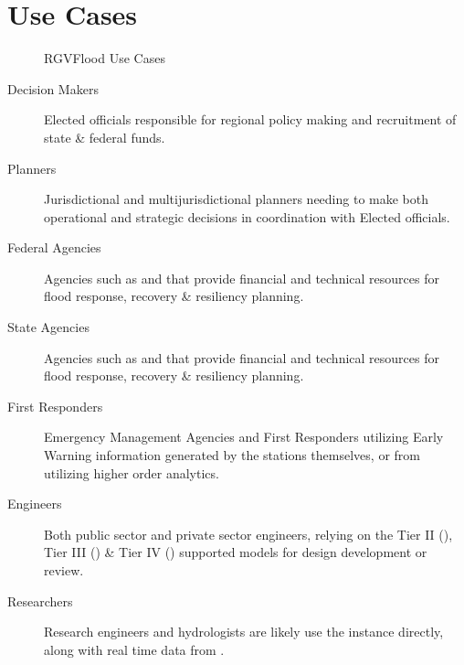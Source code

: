 \documentclass[letterpaper,12pt,english]{sphinxmanual}
\begin{document}
\chapter{Use Cases}
\label{\detokenize{predevelopment/use-cases/use-cases:use-cases}}\label{\detokenize{predevelopment/use-cases/use-cases::doc}}
\begin{figure}[htbp]
\centering
\capstart

\noindent{}
\caption{RGVFlood Use Cases}\label{\detokenize{predevelopment/use-cases/use-cases:id1}}\end{figure}
\begin{description}
\item[{Decision Makers}] \leavevmode
\sphinxAtStartPar
Elected officials responsible for regional policy making and recruitment of state \& federal funds.

\item[{Planners}] \leavevmode
\sphinxAtStartPar
Jurisdictional and multi\sphinxhyphen{}jurisdictional planners needing to make both operational and strategic decisions in coordination with Elected officials.

\item[{Federal Agencies}] \leavevmode
\sphinxAtStartPar
Agencies such as  and  that provide financial and technical resources for flood response, recovery \& resiliency planning.

\item[{State Agencies}] \leavevmode
\sphinxAtStartPar
Agencies such as  and  that provide financial and technical resources for flood response, recovery \& resiliency planning.

\item[{First Responders}] \leavevmode
\sphinxAtStartPar
Emergency Management Agencies and First Responders utilizing Early Warning information generated by the  stations themselves, or from  utilizing higher order analytics.

\item[{Engineers}] \leavevmode
\sphinxAtStartPar
Both public sector and private sector engineers, relying on the  Tier II (), Tier III () \& Tier IV () supported models for design development or review.

\item[{Researchers}] \leavevmode
\sphinxAtStartPar
Research engineers and hydrologists are likely use the   instance directly, along with real time data from .

\end{description}


\renewcommand{\indexname}{Index}
\printindex
\end{document}
